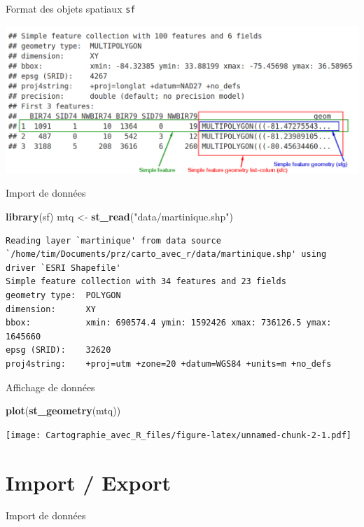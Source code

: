 \documentclass[]{book}
\newenvironment{Shaded}{\begin{snugshade}}{\end{snugshade}}
\newcommand{\KeywordTok}[1]{\textcolor[rgb]{0.13,0.29,0.53}{\textbf{#1}}}
\newcommand{\NormalTok}[1]{#1}
\newcommand{\StringTok}[1]{\textcolor[rgb]{0.31,0.60,0.02}{#1}}
\begin{document}
Format des objets spatiaux \texttt{sf}

\includegraphics{img/sf.png}

Import de données

\begin{Shaded}
\begin{Highlighting}[]
\KeywordTok{library}\NormalTok{(sf)}
\NormalTok{mtq <-}\StringTok{ }\KeywordTok{st_read}\NormalTok{(}\StringTok{"data/martinique.shp"}\NormalTok{)}
\end{Highlighting}
\end{Shaded}

\begin{verbatim}
Reading layer `martinique' from data source `/home/tim/Documents/prz/carto_avec_r/data/martinique.shp' using driver `ESRI Shapefile'
Simple feature collection with 34 features and 23 fields
geometry type:  POLYGON
dimension:      XY
bbox:           xmin: 690574.4 ymin: 1592426 xmax: 736126.5 ymax: 1645660
epsg (SRID):    32620
proj4string:    +proj=utm +zone=20 +datum=WGS84 +units=m +no_defs
\end{verbatim}

Affichage de données

\begin{Shaded}
\begin{Highlighting}[]
\KeywordTok{plot}\NormalTok{(}\KeywordTok{st_geometry}\NormalTok{(mtq))}
\end{Highlighting}
\end{Shaded}

\texttt{[image: Cartographie\_avec\_R\_files/figure-latex/unnamed-chunk-2-1.pdf]}

\hypertarget{import-export}{%
\section{Import / Export}\label{import-export}}

Import de données
\end{document}
